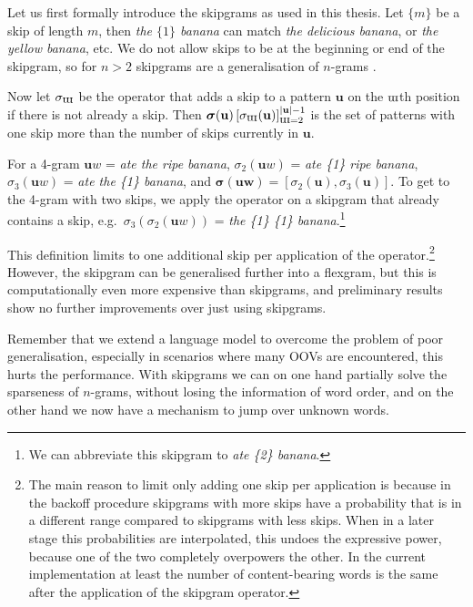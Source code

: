 Let us first formally introduce the skipgrams as used in this thesis. Let $\{m\}$ be a skip of length $m$, then \emph{the $\{1\}$ banana} can match \emph{the delicious banana}, or \emph{the yellow banana}, etc. We do not allow skips to be at the beginning or end of the skipgram, so for $n>2$ skipgrams are a generalisation of $n$-grams \cite{goodman2001bit,shazeer2015sparse,Pickhardt2014GLM}.

Now let $\sigma_{\rotatebox[origin=c]{180}{m}}$ be the operator that adds a skip to a pattern $\mathbf{u}$ on the $\rotatebox[origin=c]{180}{m}$th position if there is not already a skip. Then $\boldsymbol\sigma(\mathbf{u}) \left[\sigma_{\rotatebox[origin=c]{180}{m}}(\mathbf{u})\right]_{\rotatebox[origin=c]{180}{m}=2}^{|\mathbf{u}|-1}$ is the set of patterns with one skip more than the number of skips currently in $\mathbf{u}$. 



For a 4-gram $\mathbf{u}w$ = \emph{ate the ripe banana}, $\sigma_2(\mathbf{u}w)$ = \emph{ate \{1\} ripe banana}, $\sigma_3(\mathbf{u}w)$ = \emph{ate the \{1\} banana}, and $\boldsymbol\sigma(\mathbf{uw}) = \left[\sigma_2(\mathbf{u}), \sigma_3(\mathbf{u})\right]$. To get to the 4-gram with two skips, we apply the operator on a skipgram that already contains a skip, e.g.~$\sigma_3(\sigma_2(\mathbf{u}w))$ = \emph{the \{1\} \{1\} banana}.\footnote{We can abbreviate this skipgram to \emph{ate \{2\} banana}.}

This definition limits to one additional skip per application of the operator.\footnote{The main reason to limit only adding one skip per application is because in the backoff procedure skipgrams with more skips have a probability that is in a different range compared to skipgrams with less skips. When in a later stage this probabilities are interpolated, this undoes the expressive power, because one of the two completely overpowers the other. In the current implementation at least the number of content-bearing words is the same after the application of the skipgram operator.} However, the skipgram can be generalised further into a flexgram\cite{gompel2016efficient}, but this is computationally even more expensive than skipgrams, and preliminary results show no further improvements over just using skipgrams.

Remember that we extend a language model to overcome the problem of poor generalisation, especially in scenarios where many OOVs are encountered, this hurts the performance. With skipgrams we can on one hand partially solve the sparseness of $n$-grams, without losing the information of word order, and on the other hand we now have a mechanism to jump over unknown words.

